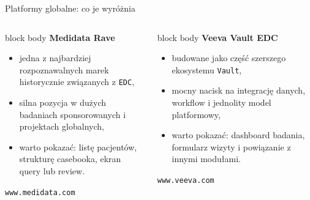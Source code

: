\begin{frame}{Platformy globalne: co je wyróżnia}
  \footnotesize
  \begin{columns}[T,onlytextwidth]
    \begin{beamercolorbox}[wd=\linewidth,sep=0.8em,rounded=true]{block body}
      \textbf{\textcolor{UAFMTeal}{Medidata Rave}}\par\medskip
      \begin{itemize}
        \item jedna z najbardziej rozpoznawalnych marek historycznie związanych z \texttt{EDC},
        \item silna pozycja w dużych badaniach sponsorowanych i projektach globalnych,
        \item warto pokazać: listę pacjentów, strukturę casebooka, ekran query lub review.
      \end{itemize}
      \texttt{www.medidata.com}
    \end{beamercolorbox}

    \begin{beamercolorbox}[wd=\linewidth,sep=0.8em,rounded=true]{block body}
      \textbf{\textcolor{UAFMOrange}{Veeva Vault EDC}}\par\medskip
      \begin{itemize}
        \item budowane jako część szerszego ekosystemu \texttt{Vault},
        \item mocny nacisk na integrację danych, workflow i jednolity model platformowy,
        \item warto pokazać: dashboard badania, formularz wizyty i powiązanie z innymi modułami.
      \end{itemize}
      \texttt{www.veeva.com}
    \end{beamercolorbox}
  \end{columns}
\end{frame}

